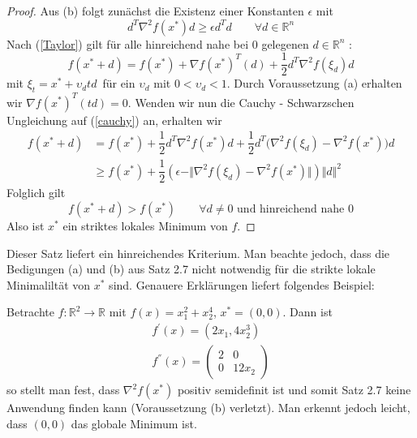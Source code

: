 \documentclass[a4paper,10pt]{scrartcl}
\begin{document}
\begin{proof}
	Aus (b) folgt zunächst die Existenz einer Konstanten $\epsilon$ mit 
	\begin{equation*}
	d^{T}\nabla^{2} f(x^{*})d \ge \epsilon d^{T}d \qquad \forall d \in \mathbb{R}^{n}
	\end{equation*}
	Nach (\ref{Taylor}) gilt für alle hinreichend nahe bei 0 gelegenen $d \in \mathbb{R}^{n}$ :
	\begin{equation}
	f(x^{*}+d) = f(x^{*}) + \nabla f(x^{*})^{T}(d) + \dfrac{1}{2}d^{T} \nabla^{2} f(\xi_{d})d
	\label{cauchy}
	\end{equation}
	mit $\xi_{t} = x^{*} + \upsilon_{d}td \,$ für ein $\upsilon_{d}$ mit $0 < \upsilon_{d} < 1$. Durch Voraussetzung (a) erhalten wir $\nabla f(x^{*})^{T}(td) = 0$.  Wenden wir nun die Cauchy - Schwarzschen Ungleichung auf (\ref{cauchy}) an, erhalten wir 
	\begin{equation*}
	\begin{split}
	f(x^{*}+d)  &= f(x^{*}) + \dfrac{1}{2}d^{T} \nabla^{2} f(x^{*})d+ \dfrac{1}{2} d^{T} \big( \nabla^{2} f(\xi_{d}) - \nabla^{2} f(x^{*}) \big) d \\
	& \ge
	f(x^{*}) + \dfrac{1}{2}(\epsilon - \Vert \nabla^{2}f(\xi_{d}) - \nabla^{2}f(x^{*}) \Vert) \Vert d \Vert ^{2}
	\end{split}
	\end{equation*}
	Folglich gilt 
	\begin{equation*}
	f(x^{*} +d) > f(x^{*}) \qquad \forall d\neq 0 \text{ und  hinreichend nahe }  0
	\end{equation*}
	Also ist $x^{*}$ ein striktes lokales Minimum von $f$.
\end{proof}

\begin{bemerkung}
	Dieser Satz liefert ein hinreichendes Kriterium. Man beachte jedoch, dass die Bedigungen (a) und (b) aus Satz 2.7 nicht notwendig für die strikte lokale Minimaliltät von $x^{*}$ sind. Genauere Erklärungen liefert folgendes Beispiel:
\end{bemerkung}

\begin{beispiel}
	Betrachte $ f: \mathbb{R}^{2} \longrightarrow \mathbb{R} $ mit $f(x) = x_{1}^{2} + x_{2}^{4}$, $x^{*} =(0,0)$.  Dann ist
	\begin{align*}
	f^{'}(x)=(2x_{1} , 4x_{2}^{3}) \\
	f^{''}(x)= \begin{pmatrix}
	2 & 0 \\
	0 & 12x_{2}
	\end{pmatrix}
	\end{align*}
	so stellt man fest, dass $\nabla^{2} f(x^{*})$  positiv semidefinit ist und somit Satz 2.7 keine Anwendung finden kann (Voraussetzung (b) verletzt). Man erkennt jedoch leicht, dass $(0,0)$ das globale Minimum ist.
\end{beispiel}
\end{document}
